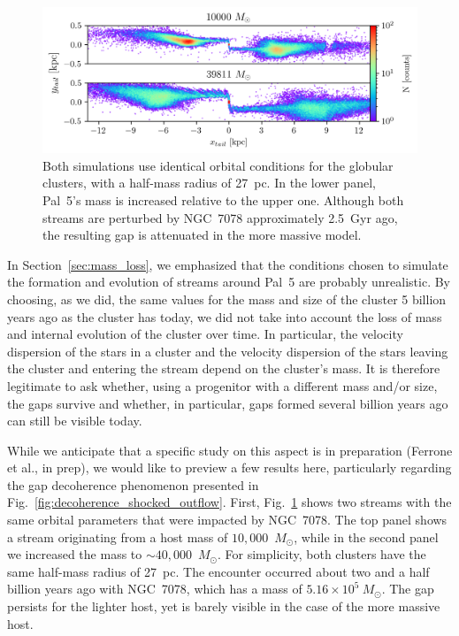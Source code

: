         \begin{figure}
            \centering
            \includegraphics[width=\linewidth]{images/gap_no_more.png}
            \caption[Demonstration of how the internal dynamics can influence gap persistence]{Both simulations use identical orbital conditions for the globular clusters, with a half-mass radius of 27~pc. In the lower panel, Pal~5's mass is increased relative to the upper one. Although both streams are perturbed by NGC~7078 approximately 2.5~Gyr ago, the resulting gap is attenuated in the more massive model.}
            \label{fig:gap_no_more}
        \end{figure}

        In Section~\ref{sec:mass_loss}, we emphasized that the conditions chosen to simulate the formation and evolution of streams around Pal~5 are probably unrealistic. By choosing, as we did, the same values for the mass and size of the cluster 5 billion years ago as the cluster has today, we did not take into account the loss of mass and internal evolution of the cluster over time. In particular, the velocity dispersion of the stars in a cluster and the velocity dispersion of the stars leaving the cluster and entering the stream depend on the cluster's mass. It is therefore legitimate to ask whether, using a progenitor with a different mass and/or size, the gaps survive and whether, in particular, gaps formed several billion years ago can still be visible today. 

        While we anticipate that a specific study on this aspect is in preparation (Ferrone et al., in prep), we would like to preview a few results here, particularly regarding the gap decoherence phenomenon presented in Fig.~\ref{fig:decoherence_shocked_outflow}. First, Fig.~\ref{fig:gap_no_more} shows two streams with the same orbital parameters that were impacted by NGC~7078. The top panel shows a stream originating from a host mass of $10,000$~$M_\odot$, while in the second panel we increased the mass to $\sim40,000$~$M_\odot$. For simplicity, both clusters have the same half-mass radius of 27~pc. The encounter occurred about two and a half billion years ago with NGC~7078, which has a mass of $5.16\times10^{5}~M_\odot$. The gap persists for the lighter host, yet is barely visible in the case of the more massive host.

